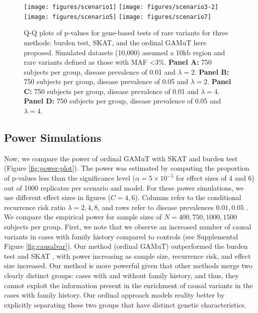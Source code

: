 \documentclass[]{article}
\begin{document}
\begin{figure}

{\centering \texttt{[image: figures/scenario1]} \texttt{[image: figures/scenario3-2]} \texttt{[image: figures/scenario5]} \texttt{[image: figures/scenario7]} 

}

\caption{Q-Q plots of p-values for gene-based tests of rare variants for three methods: burden test, SKAT, and the ordinal GAMuT here proposed. Simulated datasets (10,000) assumed a 10kb region and rare variants defined as those with MAF <3\%. \textbf{Panel A:} 750 subjects per group,  disease prevalence of 0.01 and $\lambda=2$. \textbf{Panel B:} 750 subjects per group, disease prevalence of 0.05 and $\lambda=2$. \textbf{Panel C:} 750 subjects per group, disease prevalence of 0.01 and $\lambda=4$. \textbf{Panel D:} 750 subjects per group, disease prevalence of 0.05 and $\lambda=4$.}\label{fig:qq}
\end{figure}

\hypertarget{power-simulations}{%
\subsection{Power Simulations}\label{power-simulations}}

Now, we compare the power of ordinal GAMuT with SKAT and burden test (Figure \ref{fig:power-plot}). The power was estimated by computing the proportion of p-values less than the significance level (\(\alpha=5 \times 10^{-5}\) for effect sizes of 4 and 6) out of 1000 replicates per scenario and model.
For these power simulations, we use different effect sizes in figures (\(C=4,6\)). Columns refer to the conditional recurrence risk ratio \(\lambda=2,4,8\), and rows refer to disease prevalences \(0.01,0.05\) . We compare the empirical power for sample sizes of \(N=400,750,1000,1500\) subjects per group. First, we note that we observe an increased number of causal variants in cases with family history compared to controls (see Supplemental Figure \ref{fig:causalvar}). Our method (ordinal GAMuT) outperformed the burden test \citep{Li2008, Madsen2009} and SKAT \citep{Wu2011}, with power increasing as sample size, recurrence risk, and effect size increased.
Our method is more powerful given that other methods merge two clearly distinct groups: cases with and without family history, and thus, they cannot exploit the information present in the enrichment of causal variants in the cases with family history. Our ordinal approach models reality better by explicitly separating these two groups that have distinct genetic characteristics.
\end{document}

